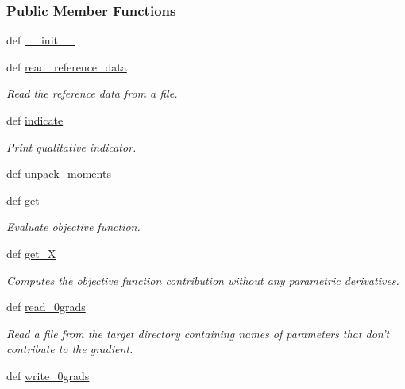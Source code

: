 \subsubsection*{Public Member Functions}
\begin{DoxyCompactItemize}
\item 
def \hyperlink{classforcebalance_1_1tinkerio_1_1Moments__TINKER_a55fdabe19222bb5804724a8f0d550547}{\-\_\-\-\_\-init\-\_\-\-\_\-}
\item 
def \hyperlink{classforcebalance_1_1moments_1_1Moments_a2048e58340147becb826702f61442227}{read\-\_\-reference\-\_\-data}
\begin{DoxyCompactList}\small\item\em Read the reference data from a file. \end{DoxyCompactList}\item 
def \hyperlink{classforcebalance_1_1moments_1_1Moments_a2f51fa0fb20454ef3eb51b99e2ad103c}{indicate}
\begin{DoxyCompactList}\small\item\em Print qualitative indicator. \end{DoxyCompactList}\item 
def \hyperlink{classforcebalance_1_1moments_1_1Moments_a57f58da1365a48fbca1267e9f7228ab8}{unpack\-\_\-moments}
\item 
def \hyperlink{classforcebalance_1_1moments_1_1Moments_a488308fb94a59f876efecb115b2e60b3}{get}
\begin{DoxyCompactList}\small\item\em Evaluate objective function. \end{DoxyCompactList}\item 
def \hyperlink{classforcebalance_1_1target_1_1Target_a606dd136f195c267c05a2455405e5949}{get\-\_\-\-X}
\begin{DoxyCompactList}\small\item\em Computes the objective function contribution without any parametric derivatives. \end{DoxyCompactList}\item 
def \hyperlink{classforcebalance_1_1target_1_1Target_a09bb0e8350a17974c908a9728b2709bf}{read\-\_\-0grads}
\begin{DoxyCompactList}\small\item\em Read a file from the target directory containing names of parameters that don't contribute to the gradient. \end{DoxyCompactList}\item 
def \hyperlink{classforcebalance_1_1target_1_1Target_acc7601caa4b719bf7e31961c2eb30dd7}{write\-\_\-0grads}

\end{DoxyCompactItemize}
